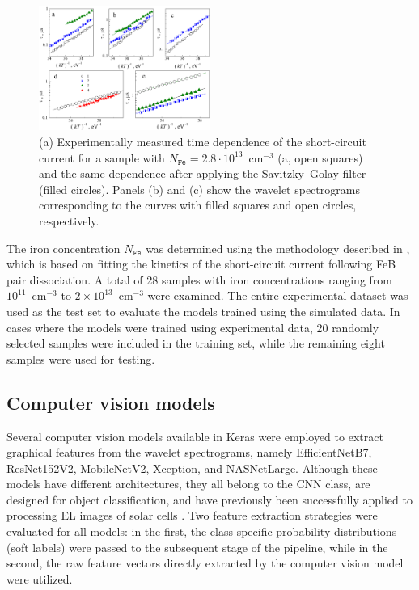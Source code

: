 \documentclass[10pt]{iopart}
\begin{document}
\begin{figure}
\includegraphics[width=0.5\textwidth]{Fig3}
\caption{\label{Fig3}
(a) Experimentally measured time dependence of the short-circuit current for a sample with
$N_\mathtt{Fe}=2.8\cdot10^{13}$~cm$^{-3}$ (a, open  squares) and the same dependence after applying the Savitzky–Golay filter (filled circles).
Panels (b) and (c) show the wavelet spectrograms corresponding to the curves with filled squares and open circles, respectively.
}%
\end{figure}

The iron concentration $N_\mathtt{Fe}$ was determined using the methodology described in \cite{Olikh2022:JMatSci,Olikh2021JAP},
which is based on fitting the kinetics of the short-circuit current following FeB pair dissociation.
A total of 28 samples with iron concentrations ranging from $10^{11}$~cm$^{-3}$ to $2\times10^{13}$~cm$^{-3}$ were examined.
The entire experimental dataset was used as the test set to evaluate the models trained using the simulated data.
In cases where the models were trained using experimental data, 20 randomly selected samples were included in the training set,
while the remaining eight samples were used for testing.



\subsection{Computer vision models}\label{subsec:CompVisMod}

Several computer vision models available in Keras were employed to extract graphical features from the wavelet spectrograms,
namely EfficientNetB7, ResNet152V2, MobileNetV2, Xception, and NASNetLarge.
Although these models have different architectures, they all belong to the CNN class, are designed for object classification,
and have previously been successfully applied  to processing EL images of solar cells \cite{Jia2024, Otamendi2021, Chen2022, Abdelsattar2025, tella2025}.
Two feature extraction strategies were evaluated for all models:
in the first, the class-specific probability distributions (soft labels) were passed to the subsequent stage of the pipeline,
while in the second, the raw feature vectors directly extracted by the computer vision model were utilized.
\end{document}
